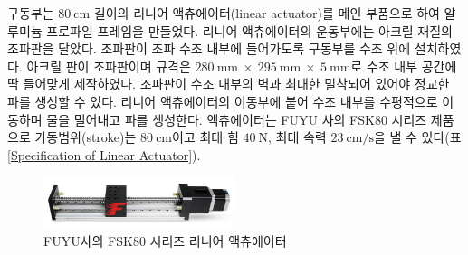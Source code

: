 구동부는 $80\mathrm{~cm}$ 길이의 리니어 액츄에이터(linear actuator)를 메인 부품으로 하여 알루미늄 프로파일 프레임을 만들었다. 리니어 액츄에이터의 운동부에는 아크릴 재질의 조파판을 달았다. 조파판이 조파 수조 내부에 들어가도록 구동부를 수조 위에 설치하였다. 아크릴 판이 조파판이며 규격은 $280\mathrm{~mm} ~\times~ 295\mathrm{~mm} ~\times~5\mathrm{~mm}$로 수조 내부 공간에 딱 들어맞게 제작하였다. 조파판이 수조 내부의 벽과 최대한 밀착되어 있어야 정교한 파를 생성할 수 있다. 리니어 액츄에이터의 이동부에 붙어 수조 내부를 수평적으로 이동하며 물을 밀어내고 파를 생성한다. 액츄에이터는 FUYU 사의 FSK80 시리즈 제품으로 가동범위(stroke)는 $80\mathrm{~cm}$이고 최대 힘 $40\mathrm{~N}$, 최대 속력 $23\mathrm{~cm/s}$을 낼 수 있다(표 \ref{Specification of Linear Actuator}).

\begin{figure}
    \centering
    \includegraphics[width=0.5\textwidth]{images/Linear_Actuator.jpg}
    \caption{FUYU사의 FSK80 시리즈 리니어 액츄에이터}
    \label{Linear Actuator}
\end{figure}

